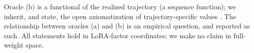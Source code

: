 \begin{proposition}\label{prop:scope}
Oracle (b) is a functional of the realized trajectory (a sequence function); we
inherit, and state, the open axiomatization of trajectory-specific values
\citep{wang2024irds}. The relationship between oracles (a) and (b) is an
empirical question, and reported as such. All statements hold in LoRA-factor
coordinates; we make no claim in full-weight space.
\end{proposition}
